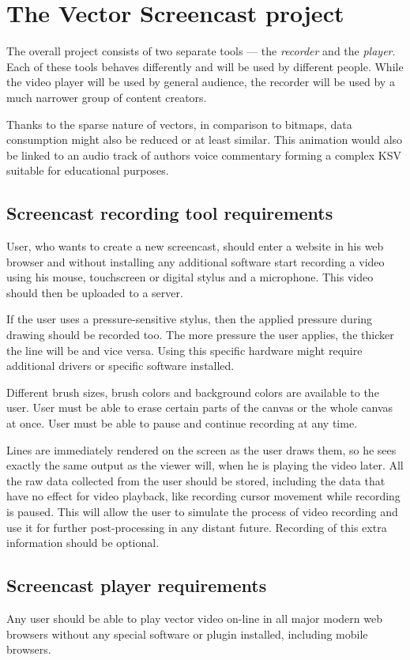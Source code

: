\chapter{The Vector Screencast project}

The overall project consists of two separate tools --- the \textit{recorder} and the \textit{player}. Each of these tools behaves differently and will be used by different people. While the video player will be used by general audience, the recorder will be used by a much narrower group of content creators.

Thanks to the sparse nature of vectors, in comparison to bitmaps, data consumption might also be reduced or at least similar. This animation would also be linked to an audio track of authors voice commentary forming a complex KSV suitable for educational purposes.

\section{Screencast recording tool requirements}
User, who wants to create a new screencast, should enter a website in his web browser and without installing any additional software start recording a video using his mouse, touchscreen or digital stylus and a microphone. This video should then be uploaded to a server.

If the user uses a pressure-sensitive stylus, then the applied pressure during drawing should be recorded too. The more pressure the user applies, the thicker the line will be and vice versa. Using this specific hardware might require additional drivers or specific software installed.

Different brush sizes, brush colors and background colors are available to the user. User must be able to erase certain parts of the canvas or the whole canvas at once. User must be able to pause and continue recording at any time.

Lines are immediately rendered on the screen as the user draws them, so he sees exactly the same output as the viewer will, when he is playing the video later. All the raw data collected from the user should be stored, including the data that have no effect for video playback, like recording cursor movement while recording is paused. This will allow the user to simulate the process of video recording and use it for further post-processing in any distant future. Recording of this extra information should be optional.

\section{Screencast player requirements}
Any user should be able to play vector video on-line in all major modern web browsers without any special software or plugin installed, including mobile browsers.

